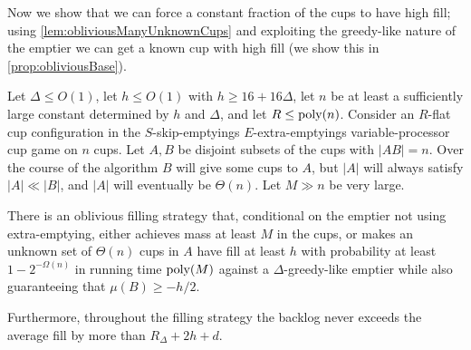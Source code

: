 Now we show that we can force a constant fraction of the cups to
have high fill; using \cref{lem:obliviousManyUnknownCups} and
exploiting the greedy-like nature of the emptier we can get a
known cup with high fill (we show this in
\cref{prop:obliviousBase}).
\begin{lemma}
  \label{lem:obliviousManyUnknownCups}
  Let $\Delta \le O(1)$, let $h \le O(1)$ with $h \ge
  16+16\Delta$, let $n$ be at least a sufficiently large constant
  determined by $h$ and $\Delta$, and let $R \le \operatorname{\text{poly}}(n)$.
  Consider an $R$-flat cup configuration in the
  $S$-skip-emptyings $E$-extra-emptyings
  variable-processor cup game on $n$ cups.
  Let $A, B$ be disjoint subsets of the cups with $|AB| = n$.
  Over the course of the algorithm $B$ will give some cups to
  $A$, but $|A|$ will always satisfy $|A| \ll |B|$, and $|A|$
  will eventually be $\Theta(n)$.
  Let $M\gg n$ be very large.

  There is an oblivious filling strategy that, conditional on the
  emptier not using extra-emptying, either achieves
  mass at least $M$ in the cups, or makes an unknown
  set of $\Theta(n)$ cups in $A$ have fill at least $h$ with
  probability at least $1-2^{-\Omega(n)}$ in running time
  $\operatorname{\text{poly}}(M)$ against a $\Delta$-greedy-like emptier while also
  guaranteeing that $\mu(B) \ge -h/2$.

  Furthermore, throughout the filling strategy the backlog never
  exceeds the average fill by more than $R_\Delta + 2h + d$.
\end{lemma}
